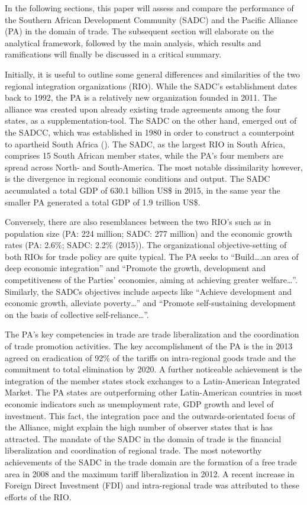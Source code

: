 In the following sections, this paper will assess and compare the performance of the Southern African Development Community (SADC) and the Pacific Alliance (PA) in the domain of trade. The subsequent section will elaborate on the analytical framework, followed by the main analysis, which results and ramifications will finally be discussed in a critical summary.

Initially, it is useful to outline some general differences and similarities of the two regional integration organizations (RIO). While the SADC’s establishment dates back to 1992, the PA is a relatively new organization founded in 2011. The alliance was created upon already existing trade agreements among the four states, as a supplementation-tool. The SADC on the other hand, emerged out of the SADCC, which was established in 1980 in order to construct a counterpoint to apartheid South Africa (\citealt{penfold2017regionalism}). The SADC, as the largest RIO in South Africa, comprises 15 South African member states, while the PA’s four members are spread across North- and South-America. The most notable dissimilarity however, is the divergence in regional economic conditions and output. The SADC accumulated a total GDP of 630.1 billion US\$ in 2015, in the same year the smaller PA generated a total GDP of 1.9 trillion US\$. 

Conversely, there are also resemblances between the two RIO’s such as in population size (PA: 224 million; SADC: 277 million) and the economic growth rates (PA: 2.6\%; SADC: 2.2\% (2015)). The organizational objective-setting of both RIOs for trade policy are quite typical. The PA seeks to “Build….an area of deep economic integration” and “Promote the growth, development and competitiveness of the Parties’ economies, aiming at achieving greater welfare…”.  Similarly, the SADCs objectives include aspects like “Achieve development and economic growth, alleviate poverty…” and “Promote self-sustaining development on the basis of collective self-reliance…”.  
   
The PA’s key competencies in trade are trade liberalization and the coordination of trade promotion activities. The key accomplishment of the PA is the in 2013 agreed on eradication of 92\% of the tariffs on intra-regional goods trade and the commitment to total elimination by 2020. A further noticeable achievement is the integration of the member states stock exchanges to a Latin-American Integrated Market.  The PA states are outperforming other Latin-American countries in most economic indicators such as unemployment rate, GDP growth and level of investment.  This fact, the integration pace and the outwards-orientated focus of the Alliance, might explain the high number of observer states that is has attracted. The mandate of the SADC in the domain of trade is the financial liberalization and coordination of regional trade. The most noteworthy achievements of the SADC in the trade domain are the formation of a free trade area in 2008 and the maximum tariff liberalization in 2012. A recent increase in Foreign Direct Investment (FDI) and intra-regional trade was attributed to these efforts of the RIO. 

